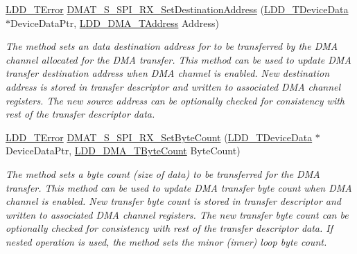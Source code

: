 \begin{DoxyCompactItemize}
\hyperlink{group___p_e___types__module_ga24c2b045fd04e79e85f261ce4df35588}{L\-D\-D\-\_\-\-T\-Error} \hyperlink{group___d_m_a_t___s___s_p_i___r_x__module_gab7d59bf4b8848b9a5377cbbad357cecc}{D\-M\-A\-T\-\_\-\-S\-\_\-\-S\-P\-I\-\_\-\-R\-X\-\_\-\-Set\-Destination\-Address} (\hyperlink{group___p_e___types__module_gac5cf1362f1f0e3a2ce71b1bf2276d091}{L\-D\-D\-\_\-\-T\-Device\-Data} $\ast$Device\-Data\-Ptr, \hyperlink{group___p_e___types__module_gab8287f62db7ff96992355760b652cd07}{L\-D\-D\-\_\-\-D\-M\-A\-\_\-\-T\-Address} Address)
\begin{DoxyCompactList}\small\item\em The method sets an data destination address for to be transferred by the D\-M\-A channel allocated for the D\-M\-A transfer. This method can be used to update D\-M\-A transfer destination address when D\-M\-A channel is enabled. New destination address is stored in transfer descriptor and written to associated D\-M\-A channel registers. The new source address can be optionally checked for consistency with rest of the transfer descriptor data. \end{DoxyCompactList}\item 
\hyperlink{group___p_e___types__module_ga24c2b045fd04e79e85f261ce4df35588}{L\-D\-D\-\_\-\-T\-Error} \hyperlink{group___d_m_a_t___s___s_p_i___r_x__module_ga28f3ef5862a3dacce62334dd0ea34e4b}{D\-M\-A\-T\-\_\-\-S\-\_\-\-S\-P\-I\-\_\-\-R\-X\-\_\-\-Set\-Byte\-Count} (\hyperlink{group___p_e___types__module_gac5cf1362f1f0e3a2ce71b1bf2276d091}{L\-D\-D\-\_\-\-T\-Device\-Data} $\ast$Device\-Data\-Ptr, \hyperlink{group___p_e___types__module_gac001a681eb67942fa78ac9b62ba3b0d6}{L\-D\-D\-\_\-\-D\-M\-A\-\_\-\-T\-Byte\-Count} Byte\-Count)
\begin{DoxyCompactList}\small\item\em The method sets a byte count (size of data) to be transferred for the D\-M\-A transfer. This method can be used to update D\-M\-A transfer byte count when D\-M\-A channel is enabled. New transfer byte count is stored in transfer descriptor and written to associated D\-M\-A channel registers. The new transfer byte count can be optionally checked for consistency with rest of the transfer descriptor data. If nested operation is used, the method sets the minor (inner) loop byte count. \end{DoxyCompactList}\end{DoxyCompactItemize}
